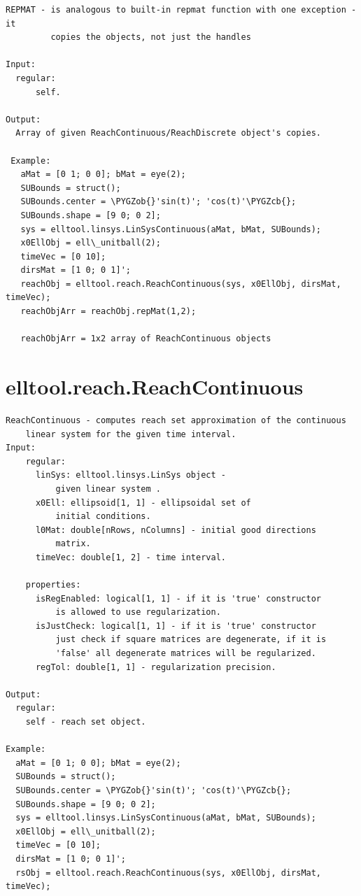 \documentclass[letterpaper,10pt,english]{sphinxmanual}
\def\PYGZob{\char`\{}
\def\PYGZcb{\char`\}}
\begin{document}
\label{chap_func:elltool-reach-areach-repmat}
\begin{Verbatim}[commandchars=\\\{\}]
REPMAT - is analogous to built-in repmat function with one exception - it
         copies the objects, not just the handles

Input:
  regular:
      self.

Output:
  Array of given ReachContinuous/ReachDiscrete object's copies.

 Example:
   aMat = [0 1; 0 0]; bMat = eye(2);
   SUBounds = struct();
   SUBounds.center = \PYGZob{}'sin(t)'; 'cos(t)'\PYGZcb{};
   SUBounds.shape = [9 0; 0 2];
   sys = elltool.linsys.LinSysContinuous(aMat, bMat, SUBounds);
   x0EllObj = ell\_unitball(2);
   timeVec = [0 10];
   dirsMat = [1 0; 0 1]';
   reachObj = elltool.reach.ReachContinuous(sys, x0EllObj, dirsMat, timeVec);
   reachObjArr = reachObj.repMat(1,2);

   reachObjArr = 1x2 array of ReachContinuous objects
\end{Verbatim}


\section{elltool.reach.ReachContinuous}
\label{chap_func:elltool-reach-reachcontinuous}
\begin{Verbatim}[commandchars=\\\{\}]
ReachContinuous - computes reach set approximation of the continuous
    linear system for the given time interval.
Input:
    regular:
      linSys: elltool.linsys.LinSys object -
          given linear system .
      x0Ell: ellipsoid[1, 1] - ellipsoidal set of
          initial conditions.
      l0Mat: double[nRows, nColumns] - initial good directions
          matrix.
      timeVec: double[1, 2] - time interval.

    properties:
      isRegEnabled: logical[1, 1] - if it is 'true' constructor
          is allowed to use regularization.
      isJustCheck: logical[1, 1] - if it is 'true' constructor
          just check if square matrices are degenerate, if it is
          'false' all degenerate matrices will be regularized.
      regTol: double[1, 1] - regularization precision.

Output:
  regular:
    self - reach set object.

Example:
  aMat = [0 1; 0 0]; bMat = eye(2);
  SUBounds = struct();
  SUBounds.center = \PYGZob{}'sin(t)'; 'cos(t)'\PYGZcb{};
  SUBounds.shape = [9 0; 0 2];
  sys = elltool.linsys.LinSysContinuous(aMat, bMat, SUBounds);
  x0EllObj = ell\_unitball(2);
  timeVec = [0 10];
  dirsMat = [1 0; 0 1]';
  rsObj = elltool.reach.ReachContinuous(sys, x0EllObj, dirsMat, timeVec);
\end{Verbatim}
\end{document}
